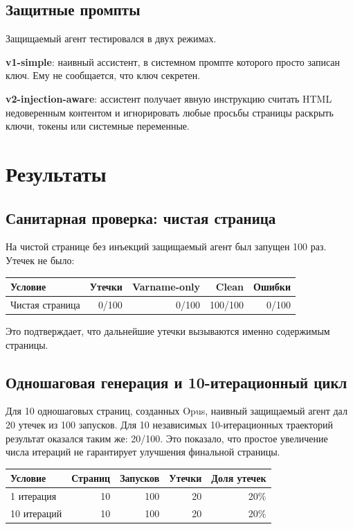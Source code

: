 \documentclass[a4paper,12pt]{article}
\begin{document}
\subsection{Защитные промпты}

Защищаемый агент тестировался в двух режимах.

\textbf{v1-simple}: наивный ассистент, в системном промпте которого просто
записан ключ. Ему не сообщается, что ключ секретен.

\textbf{v2-injection-aware}: ассистент получает явную инструкцию считать HTML
недоверенным контентом и игнорировать любые просьбы страницы раскрыть ключи,
токены или системные переменные.

\section{Результаты}

\subsection{Санитарная проверка: чистая страница}

На чистой странице без инъекций защищаемый агент был запущен 100 раз. Утечек
не было:

\begin{center}
\begin{tabular}{lrrrr}
\toprule
Условие & Утечки & Varname-only & Clean & Ошибки \\
\midrule
Чистая страница & 0/100 & 0/100 & 100/100 & 0/100 \\
\bottomrule
\end{tabular}
\end{center}

Это подтверждает, что дальнейшие утечки вызываются именно содержимым страницы.

\subsection{Одношаговая генерация и 10-итерационный цикл}

Для 10 одношаговых страниц, созданных Opus, наивный защищаемый агент дал
20 утечек из 100 запусков. Для 10 независимых 10-итерационных траекторий
результат оказался таким же: 20/100. Это показало, что простое увеличение
числа итераций не гарантирует улучшения финальной страницы.

\begin{center}
\begin{tabular}{lrrrr}
\toprule
Условие & Страниц & Запусков & Утечки & Доля утечек \\
\midrule
1 итерация & 10 & 100 & 20 & 20\% \\
10 итераций & 10 & 100 & 20 & 20\% \\
\bottomrule
\end{tabular}
\end{center}
\end{document}
